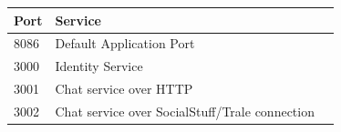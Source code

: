 \begin{table}[H]
    \centering
    \begin{tabular}{|l|l|l|}
        \toprule
        \textbf{Port} & \textbf{Service}                               \\
        \midrule
        8086          & Default Application Port                       \\
        \midrule
        3000          & Identity Service                               \\
        \midrule
        3001          & Chat service over HTTP                         \\
        \midrule
        3002          & Chat service over SocialStuff/Trale connection \\
        \bottomrule
    \end{tabular}\label{tab:table}
\end{table}

\lipsum[2-4]
